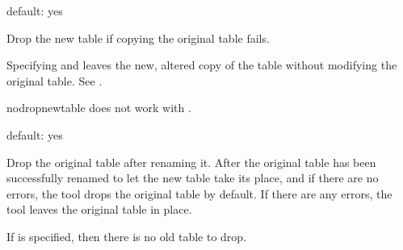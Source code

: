 \documentclass[letterpaper,10pt,english]{sphinxmanual}
\begin{document}
\begin{fulllineitems}
\label{\detokenize{mariadb-schema-change:cmdoption-mariadb-schema-change-no-drop-new-table}}
default: yes

Drop the new table if copying the original table fails.

Specifying  and  leaves the new,
altered copy of the table without modifying the original table.  See
{\hyperref[\detokenize{mariadb-schema-change:cmdoption-mariadb-schema-change-new-table-name}]{}}.

\textendash{}no\sphinxhyphen{}drop\sphinxhyphen{}new\sphinxhyphen{}table does not work with
.

\end{fulllineitems}


\begin{fulllineitems}
\label{\detokenize{mariadb-schema-change:cmdoption-mariadb-schema-change-no-drop-old-table}}
default: yes

Drop the original table after renaming it. After the original table has been
successfully renamed to let the new table take its place, and if there are no
errors, the tool drops the original table by default. If there are any errors,
the tool leaves the original table in place.

If  is specified, then there is no old table to drop.

\end{fulllineitems}
\end{document}

